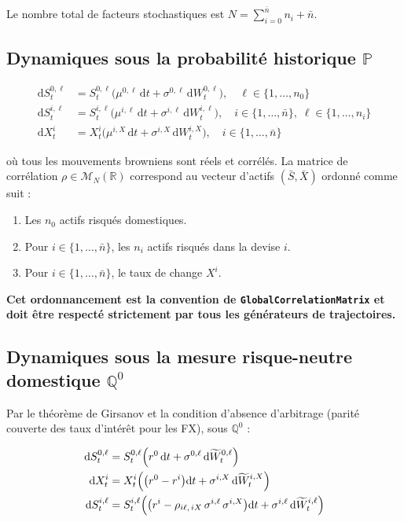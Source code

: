 \documentclass[a4paper,11pt]{article}
\newcommand{\cs}[1]{\texttt{\color{codeinline}#1}}
\newcommand{\dd}{\mathrm{d}}
\begin{document}
Le nombre total de facteurs stochastiques est $N = \displaystyle\sum_{i=0}^{\bar{n}} n_i + \bar{n}$.

\subsection{Dynamiques sous la probabilit\'e historique $\mathbb{P}$}

\begin{align}
  \dd S^{0,\ell}_t &= S^{0,\ell}_t \bigl(\mu^{0,\ell}\,\dd t + \sigma^{0,\ell}\,\dd W^{0,\ell}_t\bigr),
  \quad \ell \in \{1,\dots,n_0\} \\
  \dd S^{i,\ell}_t &= S^{i,\ell}_t \bigl(\mu^{i,\ell}\,\dd t + \sigma^{i,\ell}\,\dd W^{i,\ell}_t\bigr),
  \quad i \in \{1,\dots,\bar{n}\},\; \ell \in \{1,\dots,n_i\} \\
  \dd X^i_t &= X^i_t \bigl(\mu^{i,X}\,\dd t + \sigma^{i,X}\,\dd W^{i,X}_t\bigr),
  \quad i \in \{1,\dots,\bar{n}\}
\end{align}

o\`u tous les mouvements browniens sont r\'eels et corr\'el\'es. La matrice de corr\'elation
$\rho \in \mathcal{M}_N(\mathbb{R})$ correspond au vecteur d'actifs $(\bar{S}, \bar{X})$
ordonn\'e comme suit :

\begin{enumerate}[leftmargin=1.5em]
  \item Les $n_0$ actifs risqu\'es domestiques.
  \item Pour $i \in \{1, \dots, \bar{n}\}$, les $n_i$ actifs risqu\'es dans la devise $i$.
  \item Pour $i \in \{1, \dots, \bar{n}\}$, le taux de change $X^i$.
\end{enumerate}

\textbf{Cet ordonnancement est la convention de \cs{GlobalCorrelationMatrix} et doit
\^etre respect\'e strictement par tous les g\'en\'erateurs de trajectoires.}

\subsection{Dynamiques sous la mesure risque-neutre domestique $\mathbb{Q}^0$}

Par le th\'eor\`eme de Girsanov et la condition d'absence d'arbitrage (parit\'e couverte
des taux d'int\'er\^et pour les FX), sous $\mathbb{Q}^0$ :

\begin{align}
  \dd S^{0,\ell}_t &= S^{0,\ell}_t \Bigl(r^0\,\dd t + \sigma^{0,\ell}\,\dd \widetilde{W}^{0,\ell}_t\Bigr)
  \label{eq:dom_asset} \\
  \dd X^i_t &= X^i_t \Bigl(\bigl(r^0 - r^i\bigr)\dd t + \sigma^{i,X}\,\dd \widetilde{W}^{i,X}_t\Bigr)
  \label{eq:fx_rate} \\
  \dd S^{i,\ell}_t &= S^{i,\ell}_t \Bigl(\bigl(r^i - \rho_{i\ell,\,iX}\,\sigma^{i,\ell}\,\sigma^{i,X}\bigr)
  \dd t + \sigma^{i,\ell}\,\dd \widetilde{W}^{i,\ell}_t\Bigr)
  \label{eq:foreign_asset}
\end{align}
\end{document}
